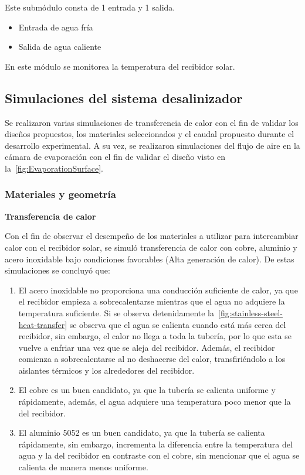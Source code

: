 				Este submódulo consta de 1 entrada y 1 salida.
				
				\begin{itemize}[columns=2]
					\item Entrada de agua fría
					\item Salida de agua caliente
				\end{itemize}
				
				\begin{center}
					En este módulo se monitorea la temperatura del recibidor solar.
				\end{center}
		
		\subsection{Simulaciones del sistema desalinizador}
			
			Se realizaron varias simulaciones de transferencia de calor con el fin de validar los diseños propuestos, los materiales seleccionados y el caudal propuesto durante el desarrollo experimental. A su vez, se realizaron simulaciones del flujo de aire en la cámara de evaporación con el fin de validar el diseño visto en la~\cref{fig:EvaporationSurface}.
			
			\subsubsection{Materiales y geometría}
			
				\textbf{Transferencia de calor}\par
			
				Con el fin de observar el desempeño de los materiales a utilizar para intercambiar calor con el recibidor solar, se simuló transferencia de calor con cobre, aluminio y acero inoxidable bajo condiciones favorables (Alta generación de calor). De estas simulaciones se concluyó que:
				
				\begin{enumerate}
					\item El acero inoxidable no proporciona una conducción suficiente de calor, ya que el recibidor empieza a sobrecalentarse mientras que el agua no adquiere la temperatura suficiente. Si se observa detenidamente la~\cref{fig:stainless-steel-heat-transfer} se observa que el agua se calienta cuando está más cerca del recibidor, sin embargo, el calor no llega a toda la tubería, por lo que esta se vuelve a enfriar una vez que se aleja del recibidor. Además, el recibidor comienza a sobrecalentarse al no deshacerse del calor, transfiriéndolo a los aislantes térmicos y los alrededores del recibidor. 
					\item El cobre es un buen candidato, ya que la tubería se calienta uniforme y rápidamente, además, el agua adquiere una temperatura poco menor que la del recibidor.
					
					\item El aluminio 5052 es un buen candidato, ya que la tubería se calienta rápidamente, sin embargo, incrementa la diferencia entre la temperatura del agua y la del recibidor en contraste con el cobre, sin mencionar que el agua se calienta de manera menos uniforme.
				\end{enumerate}
				
